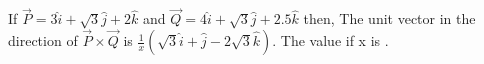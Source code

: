 \item If \(\vec{P} = 3\hat{i} + \sqrt{3}\hat{j} + 2\hat{k}\) and \(\vec{Q} = 4\hat{i} + \sqrt{3}\hat{j} + 2.5\hat{k}\) then, The unit vector in the direction of \(\vec{P} \times \vec{Q}\) is \(\frac{1}{x}(\sqrt{3}\hat{i} + \hat{j} - 2\sqrt{3}\hat{k})\). The value if x is \underline{\hspace{2.5cm}}.